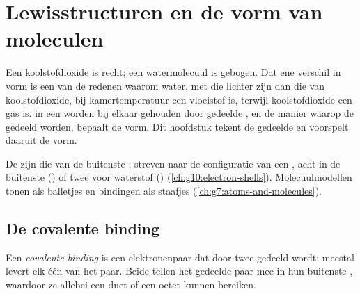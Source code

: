 \chapter{Lewisstructuren en de vorm van moleculen}\label{ch:g10:lewis-and-shape}

Een  koolstofdioxide is recht; een watermolecuul is gebogen. Dat
ene verschil in vorm is een van de redenen waarom water, met 
die lichter zijn dan die van koolstofdioxide, bij kamertemperatuur een
vloeistof is, terwijl koolstofdioxide een gas is.  in een 
worden bij elkaar gehouden door gedeelde , en de manier waarop
de  gedeeld worden, bepaalt de vorm. Dit hoofdstuk tekent de
gedeelde  en voorspelt daaruit de vorm.

\begin{recall}
De  zijn die van de buitenste ;  streven
naar de configuratie van een , acht  in de buitenste
 () of twee voor waterstof ()
(\cref{ch:g10:electron-shells}). Molecuulmodellen tonen  als
balletjes en bindingen als staafjes (\cref{ch:g7:atoms-and-molecules}).
\end{recall}

\section{De covalente binding}

\begin{definition}\label{def:g10:lewis-and-shape:covalent-bond}
Een \emph{covalente binding} is een
elektronenpaar dat door twee  gedeeld wordt; meestal levert elk
 één  van het paar. Beide  tellen het gedeelde paar mee
in hun buitenste , waardoor ze allebei een duet of een octet kunnen
bereiken.
\end{definition}

